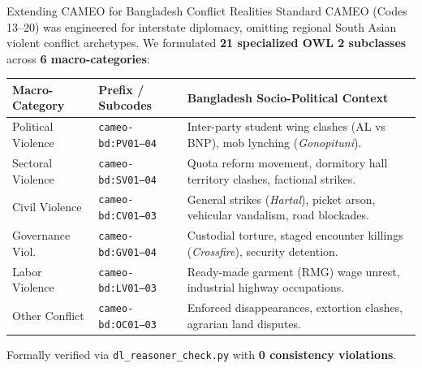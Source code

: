 \documentclass[aspectratio=169, 10pt]{beamer}
\begin{document}
\begin{frame}{Extending CAMEO for Bangladesh Conflict Realities}
  \small
  Standard CAMEO (Codes 13--20) was engineered for interstate diplomacy, omitting regional South Asian violent conflict archetypes. We formulated \textbf{21 specialized OWL 2 subclasses} across \textbf{6 macro-categories}:
  \vspace{0.4em}
  \begin{table}[h]
    \centering
    \footnotesize
    \begin{tabularx}{\textwidth}{llX}
      \toprule
      \textbf{Macro-Category} & \textbf{Prefix / Subcodes} & \textbf{Bangladesh Socio-Political Context} \\
      \midrule
      Political Violence & \texttt{cameo-bd:PV01--04} & Inter-party student wing clashes (AL vs BNP), mob lynching (\textit{Gonopituni}). \\
      Sectoral Violence  & \texttt{cameo-bd:SV01--04} & Quota reform movement, dormitory hall territory clashes, factional strikes. \\
      Civil Violence     & \texttt{cameo-bd:CV01--03} & General strikes (\textit{Hartal}), picket arson, vehicular vandalism, road blockades. \\
      Governance Viol.   & \texttt{cameo-bd:GV01--04} & Custodial torture, staged encounter killings (\textit{Crossfire}), security detention. \\
      Labor Violence     & \texttt{cameo-bd:LV01--03} & Ready-made garment (RMG) wage unrest, industrial highway occupations. \\
      Other Conflict     & \texttt{cameo-bd:OC01--03} & Enforced disappearances, extortion clashes, agrarian land disputes. \\
      \bottomrule
    \end{tabularx}
  \end{table}
  \vspace{0.2em}
  Formally verified via \texttt{dl\_reasoner\_check.py} with \textbf{0 consistency violations}.
\end{frame}
\end{document}
